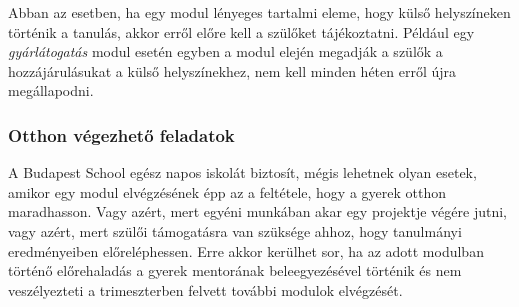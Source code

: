 Abban az esetben, ha egy modul lényeges tartalmi eleme, hogy külső helyszíneken történik a tanulás, akkor erről előre kell a szülőket tájékoztatni. Például egy \emph{gyárlátogatás} modul esetén egyben a modul elején megadják a szülők a hozzájárulásukat a külső helyszínekhez, nem kell minden héten erről újra megállapodni.

\subsubsection{Otthon végezhető feladatok}

A Budapest School egész napos iskolát biztosít, mégis lehetnek olyan esetek, amikor egy modul elvégzésének épp az a feltétele, hogy a gyerek otthon maradhasson. Vagy azért, mert egyéni munkában akar egy projektje végére jutni, vagy azért, mert szülői támogatásra van szüksége ahhoz, hogy tanulmányi eredményeiben előreléphessen. Erre akkor kerülhet sor, ha az adott modulban történő előrehaladás a gyerek mentorának beleegyezésével történik és nem veszélyezteti a trimeszterben felvett további modulok elvégzését.

